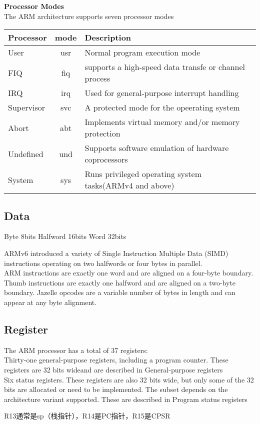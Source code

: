 \textbf{Processor Modes}\\
The ARM architecture supports seven processor modes\\
\begin{tabular}{|l|c|l|}
\hline
Processor  & mode & Description   \\\hline
User & usr & Normal program execution mode \\\hline
FIQ& fiq & supports a high-speed data transfe or channel process \\\hline
IRQ & irq & Used for general-purpose interrupt handling \\\hline
Supervisor& svc & A protected mode for the opeerating system \\\hline
Abort& abt & Implements virtual memory and/or memory protection \\\hline
Undefined& und & Supports software emulation of hardware coprocessors \\\hline
System& sys & Runs privileged operating system tasks(ARMv4 and above) \\\hline
\end{tabular}

\subsection{Data}
\begin{code}
	Byte  8bits
	Halfword  16bits
	Word 32bits
\end{code}
ARMv6 introduced a variety of Single Instruction Multiple Data (SIMD) instructions
operating on two halfwords or four bytes in parallel.\\
ARM instructions are exactly one word and are aligned on a four-byte boundary. Thumb instructions
are exactly one halfword and are aligned on a two-byte boundary. Jazelle opcodes are a variable
number of bytes in length and can appear at any byte alignment.

\subsection{Register}
\noindent The ARM processor has a total of 37 registers:\\
Thirty-one general-purpose registers, including a program counter. These registers are 32 bits wideand are described in General-purpose registers \\
Six status registers. These registers are also 32 bits wide, but only some of the 32 bits are allocated or need to be implemented. The subset depends on the architecture variant supported. These are described in Program status registers\\
\begin{code}
R13通常是sp（栈指针），R14是PC指针，R15是CPSR
\end{code}

